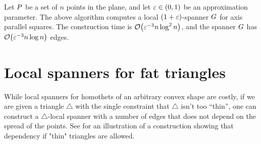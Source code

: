 \documentclass[12pt]{article}%
\begin{document}
\begin{theorem}
    Let $P$ be a set of $n$ points in the plane, and let
    $\varepsilon \in (0,1)$ be an approximation parameter. The above
    algorithm computes a local $(1+\varepsilon)$-spanner $G$ for axis
    parallel squares.  The construction time is
    $\Of\pth{\eps^{-3} n \log^2 n}$, and the spanner $G$ has
    $\Of\pth{\eps^{-3} n \log n}$ edges.
\end{theorem}




\section{Local spanners for fat triangles}



While local spanners for homothets of an arbitrary convex shape are costly,
if we are given a triangle $\triangle$ with the single constraint that $\triangle$
isn't too ``thin'', one can construct a $\triangle$-local spanner with a number of
edges that does not depend on the spread of the points. See  for an illustration of a construction showing that dependency if "thin" triangles are allowed.
\end{document}

